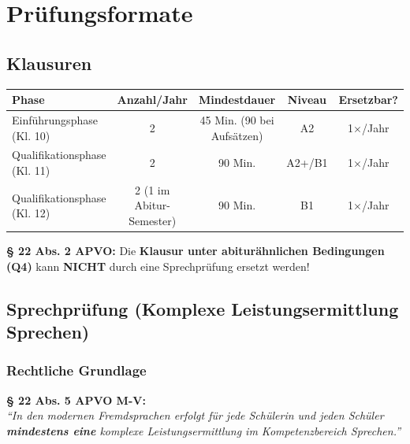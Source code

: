\documentclass[10pt,a4paper]{article}
\begin{document}

\section{Prüfungsformate}

\subsection{Klausuren}

\begin{center}
\begin{tabular}{|l|c|c|c|c|}
\hline
\rowcolor{spaet}\color{white}\textbf{Phase} & \color{white}\textbf{Anzahl/Jahr} & \color{white}\textbf{Mindestdauer} & \color{white}\textbf{Niveau} & \color{white}\textbf{Ersetzbar?} \\
\hline
Einführungsphase (Kl. 10) & 2 & 45 Min. (90 bei Aufsätzen) & A2 & 1$\times$/Jahr \\
\hline
Qualifikationsphase (Kl. 11) & 2 & 90 Min. & A2+/B1 & 1$\times$/Jahr \\
\hline
Qualifikationsphase (Kl. 12) & 2 (1 im Abitur-Semester) & 90 Min. & B1 & 1$\times$/Jahr \\
\hline
\end{tabular}
\end{center}

\begin{wichtigbox}
\textbf{§ 22 Abs. 2 APVO:} Die \textbf{Klausur unter abiturähnlichen Bedingungen (Q4)} kann \textbf{NICHT} durch eine Sprechprüfung ersetzt werden!
\end{wichtigbox}

\subsection{Sprechprüfung (Komplexe Leistungsermittlung Sprechen)}

\subsubsection{Rechtliche Grundlage}

\begin{rechtbox}
\textbf{§ 22 Abs. 5 APVO M-V:}\\
\textit{``In den modernen Fremdsprachen erfolgt für jede Schülerin und jeden Schüler \textbf{mindestens eine} komplexe Leistungsermittlung im Kompetenzbereich Sprechen.''}
\end{rechtbox}
\end{document}
